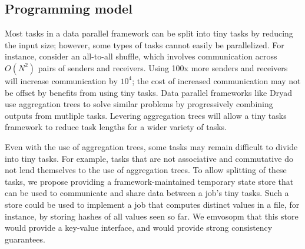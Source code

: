 \subsection{Programming model}
\label{sec:prog}
Most tasks in a data parallel framework can be split into tiny tasks by
reducing the input size; however, some types of tasks cannot easily be
parallelized.
For instance, consider an all-to-all shuffle, which involves
communication across $O(N^2)$ pairs of senders and receivers.
Using 100x more senders and receivers will increase communication by $10^4$;
the cost of increased communication may not be offset by benefits from
using tiny tasks.
Data parallel frameworks like Dryad~\cite{yu2008dryadlinq} use aggregation
trees to solve similar problems by progressively combining outputs from
mutliple tasks. Levering aggregation trees will allow a tiny tasks framework
to reduce task lengths for a wider variety of tasks.

Even with the use of aggregation trees, some tasks may remain difficult to
divide into tiny tasks. For example, tasks that are not associative and
commutative do not lend themselves to the use of aggregation trees.
To allow splitting of these tasks, we propose providing a framework-maintained
temporary state store that can be used to communicate and share data between a
job's tiny tasks. Such a store could be used to implement a job that computes
distinct values in a file, for instance, by storing hashes of all values
seen so far. We emvosopm that this store would provide a key-value interface,
and would provide strong consistency guarantees.


